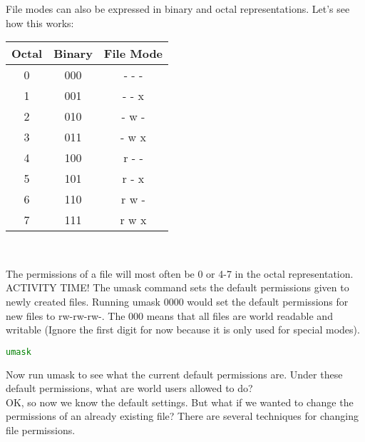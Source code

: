 \documentclass[11pt,a4paper]{article}
\begin{document}
File modes can also be expressed in binary and octal representations. Let's see how this works:\\

\begin{center}
\begin{tabular}{|c|c|c|}
\hline
Octal & Binary & File Mode \\
\hline
0 & 000 & \-- \-- \-- \\
1 & 001 & \-- \-- x \\
2 & 010 & \-- w \-- \\
3 & 011 & \-- w x \\
4 & 100 & r \-- \-- \\
5 & 101 & r \-- x \\
6 & 110 & r w \-- \\
7 & 111 &  r w x \\
 \hline
\end{tabular}\\
\end{center}

The permissions of a file will most often be 0 or 4-7 in the octal representation.\\

ACTIVITY TIME! The umask command sets the default permissions given to newly created files. Running umask 0000 would set the default permissions for new files to rw\--rw\--rw\--. The 000 means that all files are world readable and writable (Ignore the first digit for now because it is only used for special modes). 

\begin{lstlisting}[basicstyle=\ttfamily, backgroundcolor = \color{lightgray}, language = bash, xleftmargin = 0cm, framexleftmargin = 1em, breaklines=true]
umask
\end{lstlisting}

Now run umask to see what the current default permissions are. Under these default permissions, what are world users allowed to do?\\

OK, so now we know the default settings. But what if we wanted to change the permissions of an already existing file? There are several techniques for changing file permissions.
\end{document}
